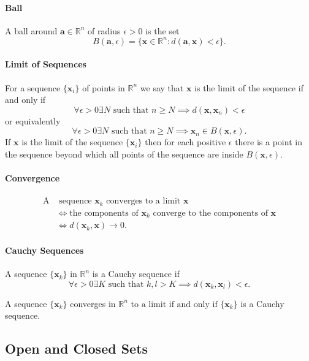 \paragraph{Ball} A ball around \(\textbf{a} \in \mathbb{R}^n\) of radius \(\epsilon > 0\)
is the set 
\[B(\textbf{a}, \epsilon) = 
\{ \textbf{x} \in \mathbb{R}^n : d(\textbf{a},\textbf{x}) < \epsilon \}.\]

\paragraph{Limit of Sequences} For a sequence \(\{\textbf{x}_i\}\) of points in \(\mathbb{R}^n\)
we say that \(\textbf{x}\) is the limit of the sequence if and only if 
\[\forall \epsilon > 0 \exists N \text{ such that } 
n \geq N \implies d(\textbf{x}, \textbf{x}_n) < \epsilon\]
or equivalently
\[\forall \epsilon > 0 \exists N \text{ such that } 
n \geq N \implies \textbf{x}_n \in B(\textbf{x}, \epsilon).\]
If \(\textbf{x}\) is the limit of the sequence \(\{\textbf{x}_i\}\) then for each positive
\(\epsilon\) there is a point in the sequence beyond which all points of the sequence are inside
\(B(\textbf{x}, \epsilon)\).

\paragraph{Convergence}
\begin{align*}
    \text{A} & \text{ sequence } \textbf{x}_k \text{ converges to a limit \(\textbf{x}\)}\\
    &\Leftrightarrow \text{the components of } \textbf{x}_k
    \text{ converge to the components of } \textbf{x} \\
    & \Leftrightarrow d(\textbf{x}_k, \textbf{x}) \rightarrow 0.
\end{align*}

\paragraph{Cauchy Sequences} A sequence \(\{\textbf{x}_k\}\) in \(\mathbb{R}^n\) is a Cauchy
sequence if 
\[\forall \epsilon > 0 \exists K \text{ such that } k, l > K \implies 
d(\textbf{x}_k, \textbf{x}_l) < \epsilon.\]

A sequence \(\{\textbf{x}_k\}\) converges in \(\mathbb{R}^n \text{ to a limit if and only if }
\{\textbf{x}_k\}\) is a Cauchy sequence.

\subsection{Open and Closed Sets}
